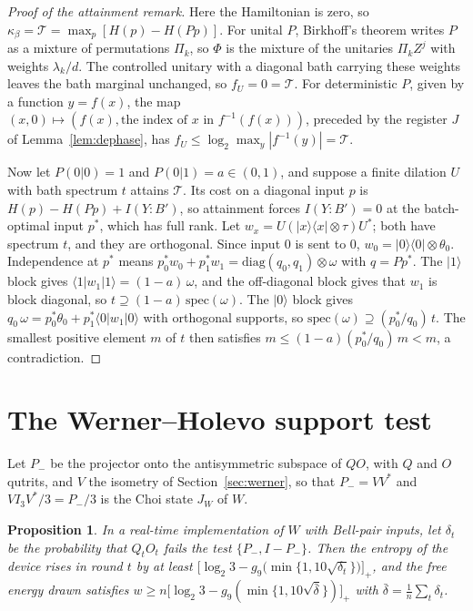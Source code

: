 \documentclass[11pt]{article}
\newtheorem{proposition}[theorem]{Proposition}
\theoremstyle{definition}
\theoremstyle{remark}
\newcommand{\Tcap}{\mathcal T}
\newcommand{\Trt}{\kappa_\beta}
\begin{document}
\begin{proof}[Proof of the attainment remark]
Here the Hamiltonian is zero, so $\Trt=\Tcap=\max_p[H(p)-H(Pp)]$. For unital $P$, Birkhoff's theorem writes $P$ as a mixture of permutations $\Pi_k$, so $\Phi$ is the mixture of the unitaries $\Pi_kZ^j$ with weights $\lambda_k/d$. The controlled unitary with a diagonal bath carrying these weights leaves the bath marginal unchanged, so $f_U=0=\Tcap$. For deterministic $P$, given by a function $y=f(x)$, the map $(x,0)\mapsto(f(x),\text{the index of }x\text{ in }f^{-1}(f(x)))$, preceded by the register $J$ of Lemma~\ref{lem:dephase}, has $f_U\le\log_2\max_y|f^{-1}(y)|=\Tcap$.

Now let $P(0|0)=1$ and $P(0|1)=a\in(0,1)$, and suppose a finite dilation $U$ with bath spectrum $t$ attains $\Tcap$. Its cost on a diagonal input $p$ is $H(p)-H(Pp)+I(Y{:}B')$, so attainment forces $I(Y{:}B')=0$ at the batch-optimal input $p^*$, which has full rank. Let $w_x=U(|x\rangle\langle x|\otimes\tau)U^*$; both have spectrum $t$, and they are orthogonal. Since input $0$ is sent to $0$, $w_0=|0\rangle\langle0|\otimes\theta_0$. Independence at $p^*$ means $p_0^*w_0+p_1^*w_1=\mathrm{diag}(q_0,q_1)\otimes\omega$ with $q=Pp^*$. The $|1\rangle$ block gives $\langle1|w_1|1\rangle=(1-a)\,\omega$, and the off-diagonal block gives that $w_1$ is block diagonal, so $t\supseteq(1-a)\,\mathrm{spec}(\omega)$. The $|0\rangle$ block gives $q_0\,\omega=p_0^*\theta_0+p_1^*\langle0|w_1|0\rangle$ with orthogonal supports, so $\mathrm{spec}(\omega)\supseteq(p_0^*/q_0)\,t$. The smallest positive element $m$ of $t$ then satisfies $m\le(1-a)(p_0^*/q_0)\,m<m$, a contradiction.
\end{proof}

\section{The Werner--Holevo support test}\label{app:werner}

Let $P_-$ be the projector onto the antisymmetric subspace of $QO$, with $Q$ and $O$ qutrits, and $V$ the isometry of Section~\ref{sec:werner}, so that $P_-=VV^*$ and $VI_3V^*/3=P_-/3$ is the Choi state $J_W$ of $W$.

\begin{proposition}\label{prop:support}
In a real-time implementation of $W$ with Bell-pair inputs, let $\delta_t$ be the probability that $Q_tO_t$ fails the test $\{P_-,I-P_-\}$. Then the entropy of the device rises in round $t$ by at least $\bigl[\log_2 3-g_9\bigl(\min\{1,10\sqrt{\delta_t}\}\bigr)\bigr]_+$, and the free energy drawn satisfies $w\ge n\bigl[\log_2 3-g_9(\min\{1,10\sqrt{\bar\delta}\})\bigr]_+$ with $\bar\delta=\frac1n\sum_t\delta_t$.
\end{proposition}
\end{document}

